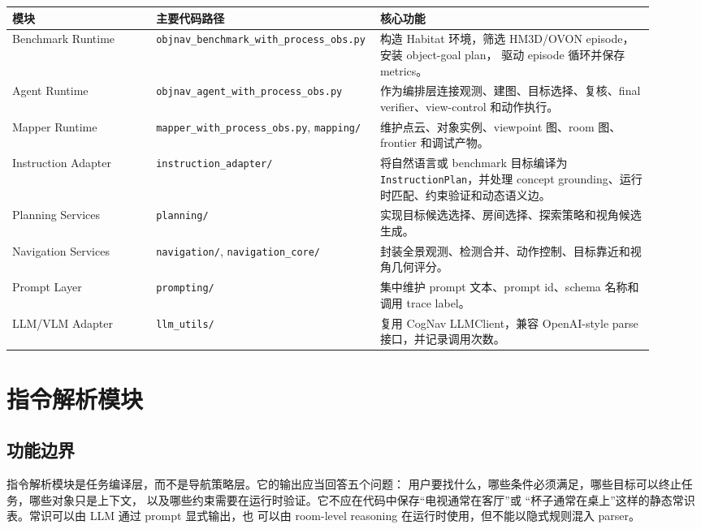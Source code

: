 \documentclass[UTF8,zihao=-4]{ctexart}
\begin{document}
\begin{longtable}{p{0.22\linewidth}p{0.28\linewidth}p{0.42\linewidth}}
\toprule
\textbf{模块} & \textbf{主要代码路径} & \textbf{核心功能} \\
\midrule
Benchmark Runtime &
\texttt{objnav\_benchmark\_with\_process\_obs.py} &
构造 Habitat 环境，筛选 HM3D/OVON episode，安装 object-goal plan，
驱动 episode 循环并保存 metrics。\\
\midrule
Agent Runtime &
\texttt{objnav\_agent\_with\_process\_obs.py} &
作为编排层连接观测、建图、目标选择、复核、final verifier、view-control
和动作执行。\\
\midrule
Mapper Runtime &
\texttt{mapper\_with\_process\_obs.py}, \texttt{mapping/} &
维护点云、对象实例、viewpoint 图、room 图、frontier 和调试产物。\\
\midrule
Instruction Adapter &
\texttt{instruction\_adapter/} &
将自然语言或 benchmark 目标编译为 \texttt{InstructionPlan}，并处理
concept grounding、运行时匹配、约束验证和动态语义边。\\
\midrule
Planning Services &
\texttt{planning/} &
实现目标候选选择、房间选择、探索策略和视角候选生成。\\
\midrule
Navigation Services &
\texttt{navigation/}, \texttt{navigation\_core/} &
封装全景观测、检测合并、动作控制、目标靠近和视角几何评分。\\
\midrule
Prompt Layer &
\texttt{prompting/} &
集中维护 prompt 文本、prompt id、schema 名称和调用 trace label。\\
\midrule
LLM/VLM Adapter &
\texttt{llm\_utils/} &
复用 CogNav LLMClient，兼容 OpenAI-style parse 接口，并记录调用次数。\\
\bottomrule
\end{longtable}

\section{指令解析模块}

\subsection{功能边界}

指令解析模块是任务编译层，而不是导航策略层。它的输出应当回答五个问题：
用户要找什么，哪些条件必须满足，哪些目标可以终止任务，哪些对象只是上下文，
以及哪些约束需要在运行时验证。它不应在代码中保存“电视通常在客厅”或
“杯子通常在桌上”这样的静态常识表。常识可以由 LLM 通过 prompt 显式输出，也
可以由 room-level reasoning 在运行时使用，但不能以隐式规则混入 parser。
\end{document}
